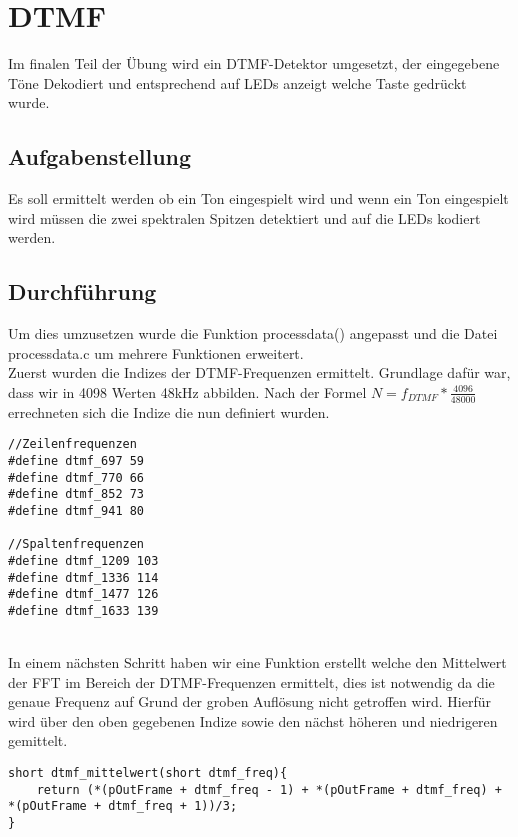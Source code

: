 \chapter{DTMF}\label{CDTMF}
Im finalen Teil der Übung wird ein DTMF-Detektor umgesetzt, der eingegebene Töne Dekodiert und entsprechend auf LEDs anzeigt welche Taste gedrückt wurde.
\section{Aufgabenstellung}\label{TDTMF}
Es soll ermittelt werden ob ein Ton eingespielt wird und wenn ein Ton eingespielt wird müssen die zwei spektralen Spitzen detektiert und auf die LEDs kodiert werden.
\section{Durchführung}\label{DDTMF}
Um dies umzusetzen wurde die Funktion process\textunderscore data() angepasst und die Datei process\textunderscore data.c um mehrere Funktionen erweitert.\\
Zuerst wurden die Indizes der DTMF-Frequenzen ermittelt. Grundlage dafür war, dass wir in 4098 Werten 48kHz abbilden. Nach der Formel \begin{math} N=f_{DTMF}*\frac{4096}{48000} \end{math} errechneten sich die Indize die nun definiert wurden.\\
\begin{adjustbox}{ keepaspectratio} 
  \label{code:procdataKompFIR}
  \begin{lstlisting}[title=Definition der Indizes]
//Zeilenfrequenzen
#define dtmf_697 59
#define dtmf_770 66
#define dtmf_852 73
#define dtmf_941 80

//Spaltenfrequenzen
#define dtmf_1209 103
#define dtmf_1336 114
#define dtmf_1477 126
#define dtmf_1633 139
\end{lstlisting}
\end{adjustbox}\\
 In einem nächsten Schritt haben wir eine Funktion erstellt welche den Mittelwert der FFT im Bereich der DTMF-Frequenzen ermittelt, dies ist notwendig da die genaue Frequenz auf Grund der groben Auflösung nicht getroffen wird. Hierfür wird über den oben gegebenen Indize sowie den nächst höheren und niedrigeren gemittelt.\\
 \begin{adjustbox}{width=\textwidth, keepaspectratio} 
  \label{code:procdataKompFIR}
  \begin{lstlisting}[title=Mittelwert der DTMF Frequenzen]
short dtmf_mittelwert(short dtmf_freq){
	return (*(pOutFrame + dtmf_freq - 1) + *(pOutFrame + dtmf_freq) + *(pOutFrame + dtmf_freq + 1))/3;
}
\end{lstlisting}
\end{adjustbox}\\
